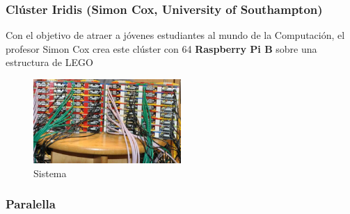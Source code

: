 \subsubsection{Clúster Iridis (Simon Cox, University of Southampton)}

Con el objetivo de atraer a jóvenes estudiantes al mundo de la Computación, el profesor Simon Cox crea este clúster con 64 \textbf{Raspberry Pi B} sobre una estructura de LEGO\cite{cox:raspberry}
\begin{figure}[H]
\centering
\includegraphics[width=0.5\textwidth]{Chapters/Chapter1/Figures/iridis-pi.jpg}
\caption{Sistema}
\label{cox:iridis}

\end{figure}

\subsubsection{Paralella}


